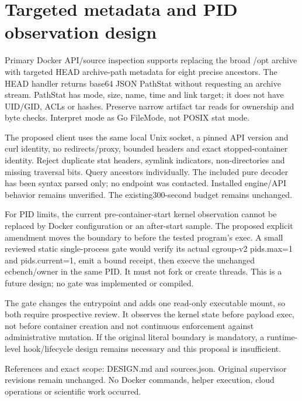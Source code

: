 \documentclass[11pt]{article}
\begin{document}
\section*{Targeted metadata and PID observation design}
Primary Docker API/source inspection supports replacing the broad /opt archive with targeted HEAD archive-path metadata for eight precise ancestors. The HEAD handler returns base64 JSON PathStat without requesting an archive stream. PathStat has mode, size, name, time and link target; it does not have UID/GID, ACLs or hashes. Preserve narrow artifact tar reads for ownership and byte checks. Interpret mode as Go FileMode, not POSIX stat mode.

The proposed client uses the same local Unix socket, a pinned API version and curl identity, no redirects/proxy, bounded headers and exact stopped-container identity. Reject duplicate stat headers, symlink indicators, non-directories and missing traversal bits. Query ancestors individually. The included pure decoder has been syntax parsed only; no endpoint was contacted. Installed engine/API behavior remains unverified. The existing300-second budget remains unchanged.

For PID limits, the current pre-container-start kernel observation cannot be replaced by Docker configuration or an after-start sample. The proposed explicit amendment moves the boundary to before the tested program's exec. A small reviewed static single-process gate would verify its actual cgroup-v2 pids.max=1 and pids.current=1, emit a bound receipt, then execve the unchanged ecbench/owner in the same PID. It must not fork or create threads. This is a future design; no gate was implemented or compiled.

The gate changes the entrypoint and adds one read-only executable mount, so both require prospective review. It observes the kernel state before payload exec, not before container creation and not continuous enforcement against administrative mutation. If the original literal boundary is mandatory, a runtime-level hook/lifecycle design remains necessary and this proposal is insufficient.

References and exact scope: DESIGN.md and sources.json. Original supervisor revisions remain unchanged. No Docker commands, helper execution, cloud operations or scientific work occurred.
\end{document}
